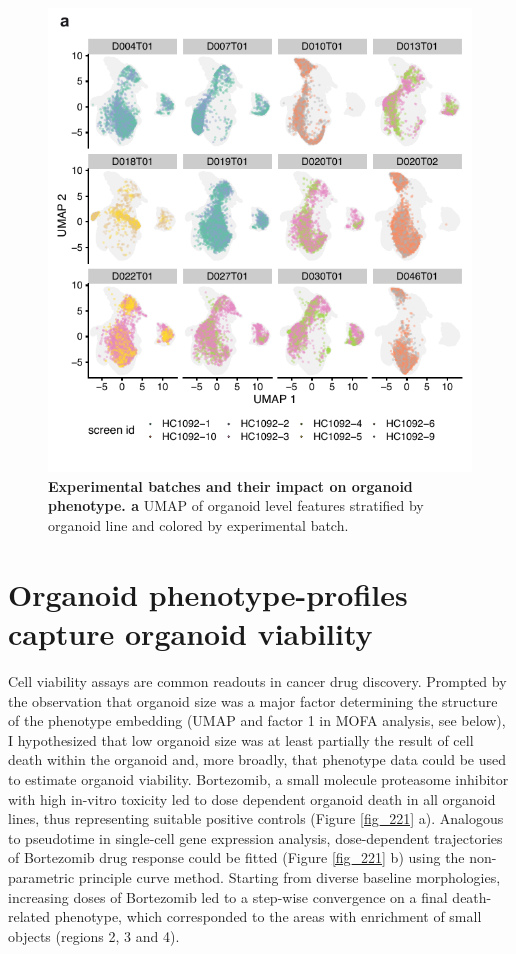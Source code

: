 \begin{flushleft}
\bigbreak

\begin{figure}[h]
\centering
\includegraphics[width=\textwidth,
                height=\textheight,
                keepaspectratio]{figures/promise/pdf/fig_1_6.pdf}
\caption{\textbf{Experimental batches and their impact on organoid phenotype. a} UMAP of organoid level features stratified by organoid line and colored by experimental batch.}
\label{fig_216}
\end{figure}
\clearpage


\section{Organoid phenotype-profiles capture organoid viability}

Cell viability assays are common readouts in cancer drug discovery. Prompted by the observation that organoid size was a major factor determining the structure of the phenotype embedding (UMAP and factor 1 in MOFA analysis, see below), I hypothesized that low organoid size was at least partially the result of cell death within the organoid and, more broadly, that phenotype data could be used to estimate organoid viability. Bortezomib, a small molecule proteasome inhibitor with high in-vitro toxicity led to dose dependent organoid death in all organoid lines, thus representing suitable positive controls (Figure \ref{fig_221} a). Analogous to pseudotime in single-cell  gene expression analysis, dose-dependent trajectories of Bortezomib drug response could be fitted (Figure \ref{fig_221} b) using the non-parametric principle curve method. Starting from diverse baseline morphologies, increasing doses of Bortezomib led to a step-wise convergence on a final death-related phenotype, which corresponded to the areas with enrichment of small objects (regions 2, 3 and 4). 


\end{flushleft}
